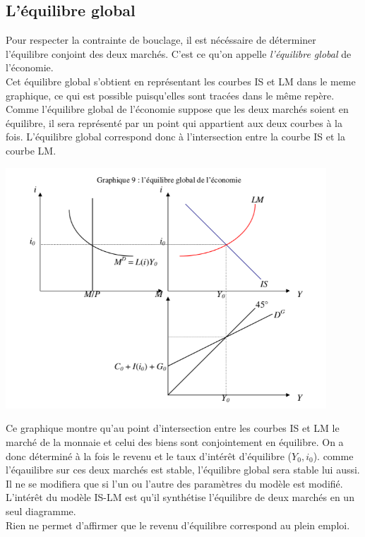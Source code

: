 \documentclass[10pt]{book}
\begin{document}
\subsection{L'équilibre global}
Pour respecter la contrainte de bouclage, il est nécéssaire de déterminer l'équilibre conjoint des deux marchés. C'est ce qu'on appelle \textit{l'équilibre global} de l'économie. \\
Cet équilibre global s'obtient en représentant les courbes IS et LM dans le meme graphique, ce qui est possible puisqu'elles sont tracées dans le même repère. Comme l'équilibre global de l'économie suppose que les deux marchés soient en équilibre, il sera représenté par un point qui appartient aux deux courbes à la fois. L'équilibre global correspond donc à l'intersection entre la courbe IS et la courbe LM.
\begin{center}
  \includegraphics[width=12cm]{graph32.png}
\end{center}
Ce graphique montre qu'au point d'intersection entre les courbes IS et LM le marché de la monnaie et celui des biens sont conjointement en équilibre. On a donc déterminé à la fois le revenu et le taux d'intérêt d'équilibre ($Y_0,i_0$). comme l'éqauilibre sur ces deux marchés est stable, l'équilibre global sera stable lui aussi. Il ne se modifiera que si l'un ou l'autre des paramètres du modèle est modifié. \\
L'intérêt du modèle IS-LM est qu'il synthétise l'équilibre de deux marchés en un seul diagramme. \\
Rien ne permet d'affirmer que le revenu d'équilibre correspond au plein emploi.



\appendix
\end{document}
